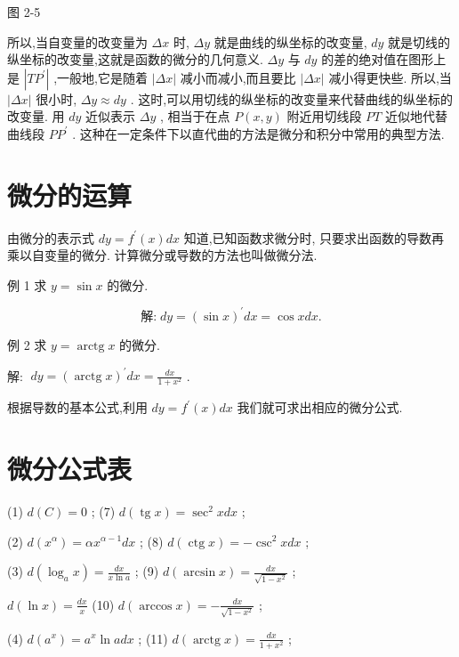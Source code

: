 \documentclass[lang=cn,newtx,10pt,scheme=chinese]{elegantbook}
\begin{document}
图 2-5

所以,当自变量的改变量为 \({\Delta x}\) 时, \({\Delta y}\) 就是曲线的纵坐标的改变量, \({dy}\) 就是切线的纵坐标的改变量,这就是函数的微分的几何意义. \({\Delta y}\) 与 \({dy}\) 的差的绝对值在图形上是 \(\left| {T{P}^{\prime }}\right|\) ,一般地,它是随着 \(\left| {\Delta x}\right|\) 减小而减小,而且要比 \(\left| {\Delta x}\right|\) 减小得更快些. 所以,当 \(\left| {\Delta x}\right|\) 很小时, \({\Delta y} \approx {dy}\) . 这时,可以用切线的纵坐标的改变量来代替曲线的纵坐标的改变量. 用 \({dy}\) 近似表示 \({\Delta y}\) , 相当于在点 \(P\left( {x,y}\right)\) 附近用切线段 \({PT}\) 近似地代替曲线段 \(P{P}^{\prime }\) . 这种在一定条件下以直代曲的方法是微分和积分中常用的典型方法.

\section{微分的运算}

由微分的表示式 \({dy} = {f}^{\prime }\left( x\right) {dx}\) 知道,已知函数求微分时, 只要求出函数的导数再乘以自变量的微分. 计算微分或导数的方法也叫做微分法.

例 1 求 \(y = \sin x\) 的微分.

\[
\text{解:}\;{dy} = {\left( \sin x\right) }^{\prime }{dx} = \cos {xdx}\text{.}
\]

例 2 求 \(y = \operatorname{arctg}x\) 的微分.

解: \(\;{dy} = {\left( \operatorname{arctg}x\right) }^{\prime }{dx} = \frac{dx}{1 + {x}^{2}}\) .

根据导数的基本公式,利用 \({dy} = {f}^{\prime }\left( x\right) {dx}\) 我们就可求出相应的微分公式.

\section*{微分公式表}

(1) \(d\left( C\right) = 0\) ; (7) \(d\left( {\operatorname{tg}x}\right) = {\sec }^{2}{xdx}\) ;

(2) \(d\left( {x}^{\alpha }\right) = \alpha {x}^{\alpha - 1}{dx}\) ; (8) \(d\left( {\operatorname{ctg}x}\right) = - {\csc }^{2}{xdx}\) ;

(3) \(d\left( {{\log }_{a}x}\right) = \frac{dx}{x\ln a}\) ; (9) \(d\left( {\arcsin x}\right) = \frac{dx}{\sqrt{1 - {x}^{2}}}\) ;

\(d\left( {\ln x}\right) = \frac{dx}{x}\) (10) \(d\left( {\arccos x}\right) = - \frac{dx}{\sqrt{1 - {x}^{2}}}\) ;

(4) \(d\left( {a}^{x}\right) = {a}^{x}\ln {adx}\) ; (11) \(d\left( {\operatorname{arctg}x}\right) = \frac{dx}{1 + {x}^{2}}\) ;
\end{document}
